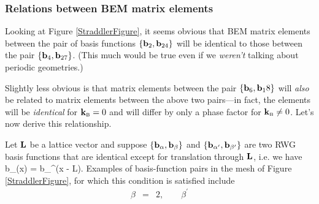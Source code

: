 \documentclass[letterpaper]{article}
\newcommand{\KB}{\vb k\subt{B}}
\begin{document}
\subsubsection{Relations between BEM matrix elements}

Looking at Figure \ref{StraddlerFigure}, it seems 
obvious that BEM matrix elements between the pair of 
basis functions
$\{\mathbf{b}_2, \mathbf{b}_{24}\}$ will be identical to those
between the pair 
$\{\mathbf{b}_4, \mathbf{b}_{27}\}$. (This much would be 
true even if we \textit{weren't} talking about
periodic geometries.)

Slightly less obvious is that matrix elements between
the pair $\{\mathbf{b}_6, \mathbf{b}_18\}$ will \textit{also}
be related to matrix elements between the above two
pairs---in fact, the elements will be \textit{identical}
for $\KB=0$ and will differ by only a phase factor
for $\KB\ne 0$. Let's now derive this relationship.

Let $\mathbf{L}$ be a lattice vector and suppose
$\{\mathbf{b}_\alpha, \mathbf{b}_\beta\}$ and
$\{\mathbf{b}_{\alpha^\prime}, \mathbf{b}_{\beta^\prime}\}$
are two RWG basis functions that are identical except 
for translation through $\mathbf{L}$, i.e. we have
 { \vb b_\beta(\vb x) = \vb b_\beta^\prime(\vb x - \vb L).
 }
Examples of basis-function pairs in the mesh of Figure 
\ref{StraddlerFigure}, for which this condition is satisfied 
include
$$\begin{array}{lclclcl}
  \beta&=&2, \qquad \beta^\prime
  \end{array}
$$

\begin{align*}
\end{align*}
\end{document}
